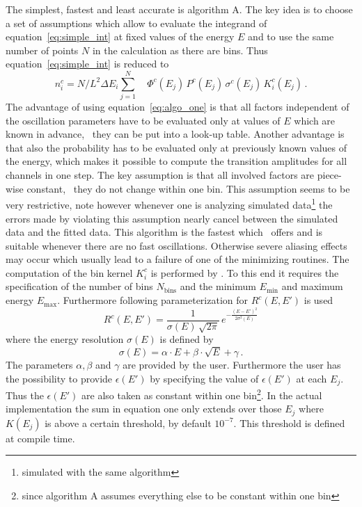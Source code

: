 The simplest, fastest and
least accurate is algorithm A. The key idea is to choose a set of assumptions
which allow to evaluate the integrand of equation~\ref{eq:simple_int}
at fixed values of the energy $E$ and to use the same number of points $N$ in
the calculation as there are bins. Thus equation~\ref{eq:simple_int} is reduced
to
\begin{equation}
\label{eq:algo_one}
n_i^c=N/L^2 \Delta E_i \sum_{j=1}^N \quad  \Phi^c(E_j)\,
P^c(E_j)\,
\sigma^c(E_j)\,
K_i^c(E_j)\,.
\end{equation}
The advantage of using equation~\ref{eq:algo_one} is that all factors
independent of the oscillation parameters have to be evaluated only at 
values of $E$ which are known in advance, \ie\ they can be put 
into a look-up table. Another advantage is that also the probability
has to be evaluated only at previously known values of the energy, which
makes it possible to compute the transition amplitudes for all channels
in one step. The key assumption is that all involved factors are piece-wise
constant, \ie\ they do not change within one bin. This assumption seems to be
very restrictive, note however whenever one is analyzing simulated 
data\footnote{simulated with the same algorithm} the errors
made by violating this assumption nearly cancel between the simulated 
data and the fitted data. This algorithm is the fastest which \GLOBES\ offers
and is suitable whenever there are no fast oscillations. Otherwise severe
aliasing effects may occur which usually lead to a failure of one of the 
minimizing routines. The computation of the bin kernel $K_i^c$ is performed
by \GLOBES. To this end it requires the specification of the number of bins
 $N_\mathrm{bins}$
and the minimum $E_\mathrm{min}$ and maximum energy $E_\mathrm{max}$. 
Furthermore following parameterization
for $R^c(E,E')$ is used
\begin{equation}
R^c(E,E')=\frac{1}{\sigma(E)\,\sqrt{2\pi}}\,e^{-\frac{(E-E')^2}{2\sigma^2(E)}}
\end{equation} 
where the energy resolution $\sigma(E)$ is defined by
\begin{equation}
\label{eq:sigma_e}
\sigma(E)=\alpha\cdot E + \beta \cdot \sqrt{E} +\gamma\,.
\end{equation}
The parameters $\alpha, \beta$ and $\gamma$ are provided by the user.
Furthermore the user has the possibility to provide 
$\epsilon(E')$ by specifying
the value of  $\epsilon(E')$ at each $E_j$. Thus the  $\epsilon(E')$ are
also taken as constant within one bin\footnote{since algorithm A assumes
everything else to be constant within one bin}. In the actual implementation 
the sum in equation one only extends over those $E_j$ where $K(E_j)$ 
is above a certain threshold, by default $10^{-7}$. This threshold is 
defined at compile time.



